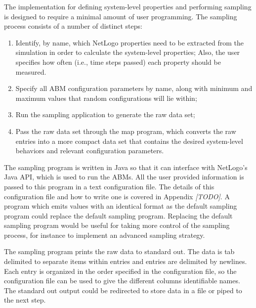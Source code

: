 The \fw implementation for defining system-level properties and performing sampling is designed to require a minimal amount of user programming.
The sampling process consists of a number of distinct steps:
\begin{enumerate}
\item Identify, by name, which NetLogo properties need to be extracted from the simulation in order to calculate the system-level properties;
Also, the user specifies how often (i.e., time steps passed) each property should be measured.
\item Specify all ABM configuration parameters by name, along with minimum and maximum values that random configurations will lie within;
\item Run the sampling application to generate the raw data set;
\item Pass the raw data set through the map program, which converts the raw entries into a more compact data set that contains the desired system-level behaviors and relevant configuration parameters.
\end{enumerate}

The sampling program is written in Java so that it can interface with NetLogo's Java API, which is used to run the ABMs.
All the user provided information is passed to this program in a text configuration file.
The details of this configuration file and how to write one is covered in Appendix \textit{[TODO]}.
A program which emits values with an identical format as the default sampling program could replace the default sampling program.
Replacing the default sampling program would be useful for taking more control of the sampling process, for instance to implement an advanced sampling strategy.

The sampling program prints the raw data to standard out.
The data is tab delimited to separate items within entries and entries are delimited by newlines.
Each entry is organized in the order specified in the configuration file, so the configuration file can be used to give the different columns identifiable names.
The standard out output could be redirected to store data in a file or piped to the next step.


